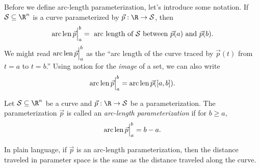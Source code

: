 Before we define arc-length parameterization, let's introduce some notation.  If $\mathcal S\subseteq \R^n$
is a curve parameterized by $\vec p:\R\to\mathcal S$, then
\[
	\operatorname{arc\,len} \vec p \Big|_{a}^{b}  = \text{ arc length of $\mathcal S$ between $\vec p(a)$ and $\vec p(b)$}.
\]
We might read $\operatorname{arc\,len} \vec p \Big|_{a}^{b}$ as the ``arc length of the curve traced by $\vec p(t)$ from
$t=a$ to $t=b$.''  Using notion for the \emph{image} of a set, we can also write
\[
	\operatorname{arc\,len} \vec p \Big|_{a}^{b} = \operatorname{arc\,len} \vec p([a,b]).
\]

\begin{definition}
	Let $\mathcal S\subseteq\R^n$ be a curve and $\vec p:\R\to\mathcal S$ be a parameterization.
	The parameterization $\vec p$ is called an \emph{arc-length parameterization} if for $b\geq a$,
	\[
		\operatorname{arc\,len} \vec p \Big|_{a}^{b}=b-a.
	\]
\end{definition}

In plain language, if $\vec p$ is an arc-length parameterization, then the distance traveled in parameter
space is the same as the distance traveled along the curve.


